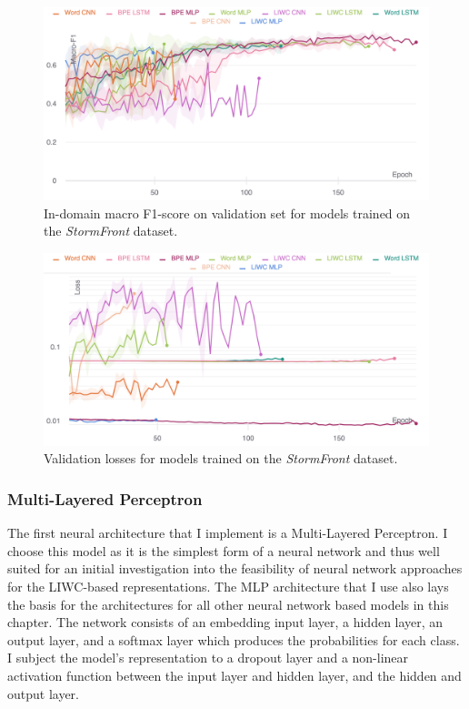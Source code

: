 \begin{figure}
    \centering
    \includegraphics[width=\textwidth]{garcia_dev_f1.pdf}
    \caption{In-domain macro F1-score on validation set for models trained on the \textit{StormFront} dataset.}
    \label{fig:garcia_dev_f1}
\end{figure}
\begin{figure}
    \centering
    \includegraphics[width=\textwidth]{garcia_dev_loss_stderr_logscale.pdf}
    \caption{Validation losses for models trained on the \textit{StormFront} dataset.}
    \label{fig:garcia_dev_loss}
\end{figure}

\subsubsection{Multi-Layered Perceptron}

The first neural architecture that I implement is a Multi-Layered Perceptron. I choose this model as it is the simplest form of a neural network and thus well suited for an initial investigation into the feasibility of neural network approaches for the LIWC-based representations. The MLP architecture that I use also lays the basis for the architectures for all other neural network based models in this chapter. The network consists of an embedding input layer, a hidden layer, an output layer, and a softmax layer which produces the probabilities for each class. I subject the model's representation to a dropout layer and a non-linear activation function between the input layer and hidden layer, and the hidden and output layer.


